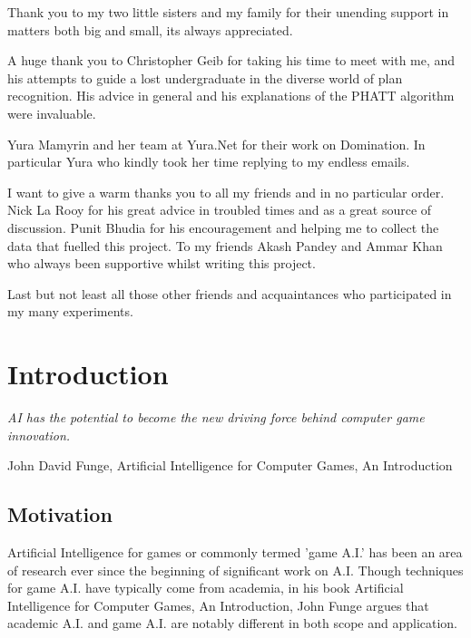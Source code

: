 \documentclass[parskip]{cs4rep}
\begin{document}
Thank you to my two little sisters and my family for their unending support in matters both big and small, its always appreciated. 

A huge thank you to Christopher Geib for taking his time to meet with me, and his attempts to guide a lost undergraduate in the diverse world of plan recognition. His advice in general and his explanations of the PHATT algorithm were invaluable. 

Yura Mamyrin and her team at Yura.Net for their work on Domination. In particular Yura who kindly took her time replying to my endless emails.

I want to give a warm thanks you to all my friends and in no particular order. Nick La Rooy for his great advice in troubled times and as a great source of discussion. Punit Bhudia for his encouragement and helping me to collect the data that fuelled this project. To my friends Akash Pandey and Ammar Khan who always been supportive whilst writing this project. 

Last but not least all those other friends and acquaintances who participated in my many experiments.

\tableofcontents


\chapter{Introduction}

\begin{flushleft}
\textit{AI has the potential to become the new driving force behind computer game innovation.}
\end{flushleft}
\begin{flushleft}
John David Funge, Artificial Intelligence for Computer Games, An Introduction
\end{flushleft}

\section{Motivation}

Artificial Intelligence for games or commonly termed 'game A.I.' has been an area of research ever since the beginning of significant work on A.I. Though techniques for game A.I. have typically come from academia, in his book Artificial Intelligence for Computer Games, An Introduction, John Funge argues \cite{JohnFunge:AIForComp} that academic A.I. and game A.I. are notably different in both scope and application.
\end{document}
